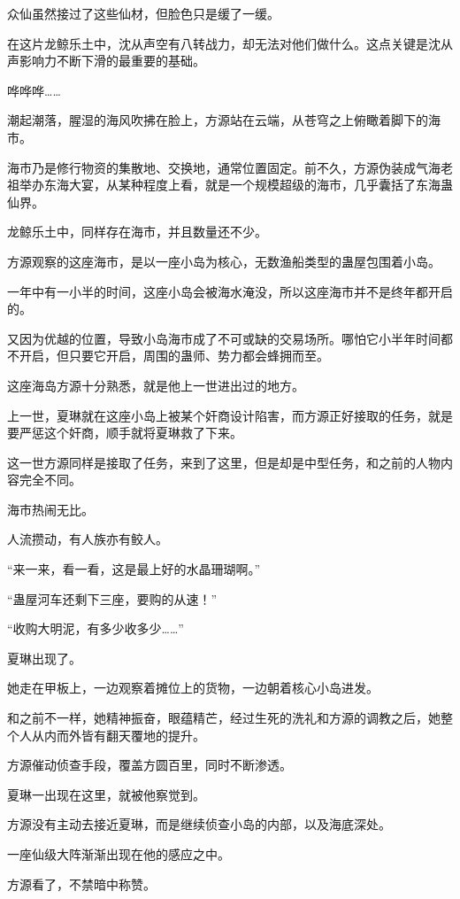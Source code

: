 \begin{this_body}
众仙虽然接过了这些仙材，但脸色只是缓了一缓。

在这片龙鲸乐土中，沈从声空有八转战力，却无法对他们做什么。这点关键是沈从声影响力不断下滑的最重要的基础。

哗哗哗……

潮起潮落，腥湿的海风吹拂在脸上，方源站在云端，从苍穹之上俯瞰着脚下的海市。

海市乃是修行物资的集散地、交换地，通常位置固定。前不久，方源伪装成气海老祖举办东海大宴，从某种程度上看，就是一个规模超级的海市，几乎囊括了东海蛊仙界。

龙鲸乐土中，同样存在海市，并且数量还不少。

方源观察的这座海市，是以一座小岛为核心，无数渔船类型的蛊屋包围着小岛。

一年中有一小半的时间，这座小岛会被海水淹没，所以这座海市并不是终年都开启的。

又因为优越的位置，导致小岛海市成了不可或缺的交易场所。哪怕它小半年时间都不开启，但只要它开启，周围的蛊师、势力都会蜂拥而至。

这座海岛方源十分熟悉，就是他上一世进出过的地方。

上一世，夏琳就在这座小岛上被某个奸商设计陷害，而方源正好接取的任务，就是要严惩这个奸商，顺手就将夏琳救了下来。

这一世方源同样是接取了任务，来到了这里，但是却是中型任务，和之前的人物内容完全不同。

海市热闹无比。

人流攒动，有人族亦有鲛人。

“来一来，看一看，这是最上好的水晶珊瑚啊。”

“蛊屋河车还剩下三座，要购的从速！”

“收购大明泥，有多少收多少……”

夏琳出现了。

她走在甲板上，一边观察着摊位上的货物，一边朝着核心小岛进发。

和之前不一样，她精神振奋，眼蕴精芒，经过生死的洗礼和方源的调教之后，她整个人从内而外皆有翻天覆地的提升。

方源催动侦查手段，覆盖方圆百里，同时不断渗透。

夏琳一出现在这里，就被他察觉到。

方源没有主动去接近夏琳，而是继续侦查小岛的内部，以及海底深处。

一座仙级大阵渐渐出现在他的感应之中。

方源看了，不禁暗中称赞。


\end{this_body}
